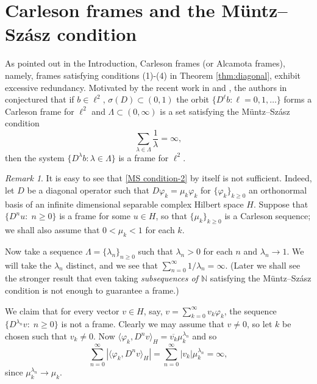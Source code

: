 \documentclass[11pt]{amsart}
\theoremstyle{definition}
\theoremstyle{remark}
\newtheorem{rem}[thm]{Remark}
\numberwithin{equation}{section}
\newcommand{\ol}{\overline}
\def\NN{\mathbb N}
\begin{document}
{\section{Carleson frames and the M\"untz--Sz\'asz condition}\label{sec:3}

As pointed out in the Introduction, Carleson frames (or Alcamota frames), namely, frames satisfying conditions (1)-(4) in Theorem \ref{thm:diagonal}, exhibit excessive redundancy. Motivated by the recent work  in \cite{ChristensenHasannasabPhilippStoeva2024} and \cite{KrishtalMiller2026}, the authors in \cite{ACKM25} conjectured that if $b\in\ell^{2}$, $\sigma(D)\subset (0,1)$ the orbit $\{D^{\ell}b:\ell=0,1,\dots\}$ forms a Carleson frame for $\ell^{2}$ and  $\Lambda \subset (0,\infty)$ is a set satisfying the M\"untz--Sz\'asz condition
\begin{equation}\label{MS condition-2}
\sum_{\lambda \in \Lambda} \frac{1}{\lambda} = \infty,
\end{equation}
then the system $\{D^{\lambda} b : \lambda \in \Lambda\}$ is a frame for $\ell^2$.}

\begin{rem}{\rm
It is easy to see that \eqref{MS condition-2} by itself is not sufficient. Indeed, let $D$ be a diagonal operator such that $D\varphi_k=\mu_k \varphi_k$ for $\{\varphi_k\}_{k\geq 0}$ an
orthonormal basis of an infinite dimensional separable complex Hilbert space $H$. Suppose that $\{D^n u:\; n\geq 0\}$ is a frame for some $u \in H$, so that $\{\mu_k\}_{k\geq 0}$ is a Carleson sequence; we shall also assume that $0< \mu_k < 1$ for each $k$.


Now take a sequence $\Lambda=\{\lambda_n\}_{n\geq 0}$ such that $ \lambda_n>0$ for each $n$ and
$\lambda_n \to 1$. We will take the $\lambda_n$ distinct, and we see that
$\sum_{n=0}^\infty 1/\lambda_n = \infty.$ (Later we shall see the stronger result that even taking {\em subsequences of $\NN$}
satisfying the M\"untz--Sz\'asz condition is not enough to guarantee a frame.)


We claim that for every vector $v \in H$, say, $v = \sum_{k=0}^\infty v_k \varphi_k$, the
sequence $\{D^{\lambda_n} v:\; n\geq 0\}$ is not a frame. Clearly we may assume that $v \ne 0$, so let $k$ be chosen such that $v_k \ne 0$.
Now $\langle \varphi_k, D^n v \rangle_H = \ol {v_k} \mu_k^{\lambda_n}$ and
so
\[
\sum_{n=0}^\infty |\langle \varphi_k, D^n v \rangle_H| =\sum_{n=0}^\infty |v_k| \mu_k^{\lambda_n} = \infty,
\]
since $\mu_k^{\lambda_n} \to \mu_k$.


}
\end{rem}
\end{document}

